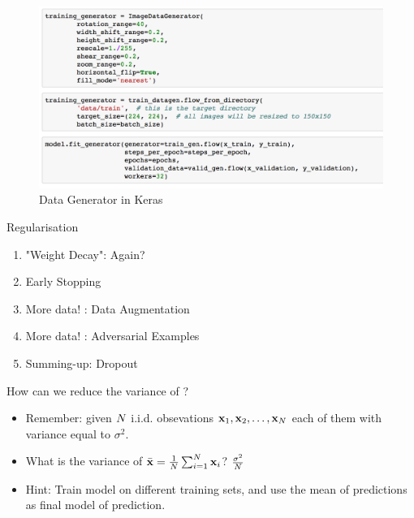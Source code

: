 \documentclass[xcolor=pdftex,dvipsnames,table,mathserif]{beamer}
\begin{document}
\begin{frame}
\begin{figure}
\includegraphics[width=.99 \columnwidth]{../graphics/DataGeneratorKeras}
\caption{Data Generator in Keras}
\end{figure}
\end{frame}

\begin{frame}{Regularisation}
\begin{enumerate}
\item "Weight Decay": Again?
\item Early Stopping
\item More data! : Data Augmentation
\item More data!  : Adversarial Examples
\item Summing-up: Dropout
\end{enumerate}
\end{frame}

\begin{frame}{How can we reduce the variance of ?}
\begin{itemize}
\item Remember: given $N$ i.i.d. obsevations $\mathbf{x}_1,\mathbf{x}_2,\ldots,\mathbf{x}_N$ each of them with variance equal to $\sigma^2$. 
\item What is the variance of $\bar{\mathbf{x}}=\frac{1}{N} \sum_{i=1}^{N} \mathbf{x}_i $? \pause $\frac{\sigma^2}{N}$
\item \alert{Hint}: Train model on different training sets, and use the mean of predictions as final model of prediction.
\end{itemize}
\end{frame}
\end{document}

